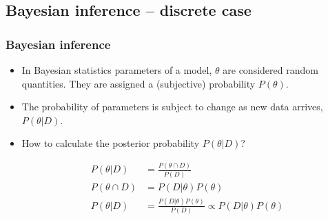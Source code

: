 \subsection{Bayesian inference -- discrete case}

\begin{frame}
    \frametitle{Bayesian inference}

    \begin{itemize}

        \item In Bayesian statistics parameters of a model, $\theta$ are considered random quantities. They are assigned a (subjective) probability $P(\theta)$.

        \item The probability of parameters is subject to change as new data arrives, $P(\theta|D)$.

            \begin{figure}
            \end{figure}

        \item How to calculate the posterior probability $P(\theta|D)$?

            \begin{align*}
                P(\theta|D)&=\frac{P(\theta\cap D)}{P(D)}\\
                P(\theta\cap D)&=P(D|\theta)P(\theta)\\
                P(\theta|D)&=\frac{P(D|\theta)P(\theta)}{P(D)}\propto P(D|\theta)P(\theta)\\
            \end{align*}

    \end{itemize}

\end{frame}

